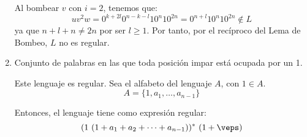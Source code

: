 \begin{ejercicio}
\begin{enumerate}
        Al bombear $v$ con $i=2$, tenemos que:
        \begin{equation*}
            uv^2w = 0^{k+2l}0^{n-k-l}10^n10^{2n} = 0^{n+l}10^{n}10^{2n} \notin L
        \end{equation*}
        ya que $n+l+n\neq 2n$ por ser $l\geq 1$. Por tanto, por el recíproco del Lema de Bombeo, $L$ no es regular.
        \item Conjunto de palabras en las que toda posición impar está ocupada por un 1.
        
        Este lenguaje es regular. Sea el alfabeto del lenguaje $A$, con $1\in A$.
        \begin{equation*}
            A=\{1,a_1,\dots,a_{n-1}\}
        \end{equation*}

        Entonces, el lenguaje tiene como expresión regular:
        \begin{equation*}
            (1~(1+a_1+a_2+\cdots+a_{n-1}))^{\ast}~(1+\veps)
        \end{equation*}
    \end{enumerate}
\end{ejercicio}


